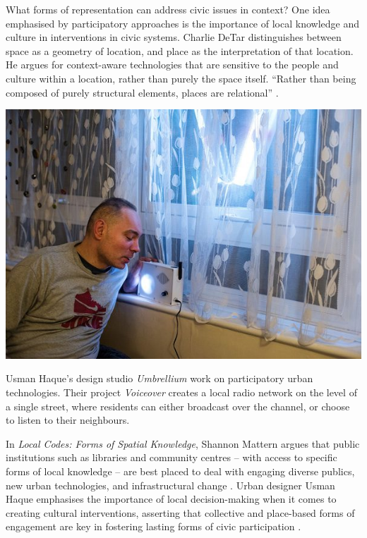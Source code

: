\documentclass[nofonts,nols,justified,nobib]{tufte-book}
\begin{document}
What forms of representation can address civic issues in context? One idea emphasised by participatory approaches is the importance of local knowledge and culture in interventions in civic systems. Charlie DeTar distinguishes between space as a geometry of location, and place as the interpretation of that location. He argues for context-aware technologies that are sensitive to the people and culture within a location, rather than purely the space itself. ``Rather than being composed of purely structural elements, places are relational'' \cite{detar_mapping_2011}.


\begin{marginfigure}
\includegraphics[width=\textwidth]{img/1/voiceover-finsbury.jpg}
\caption{Usman Haque's design studio \emph{Umbrellium} work on participatory urban technologies. Their project \emph{Voiceover} creates a local radio network on the level of a single street, where residents can either broadcast over the channel, or choose to listen to their neighbours. \cite{umbrellium_voiceover_2016}}
\end{marginfigure}


In \emph{Local Codes: Forms of Spatial Knowledge}, Shannon Mattern argues that public institutions such as libraries and community centres -- with access to specific forms of local knowledge -- are best placed to deal with engaging diverse publics, new urban technologies, and infrastructural change \cite{mattern_local_2019}. Urban designer Usman Haque emphasises the importance of local decision-making when it comes to creating cultural interventions, asserting that collective and place-based forms of engagement are key in fostering lasting forms of civic participation \cite{haque_citizen_2017, haque_notes_2008}. 
\end{document}
